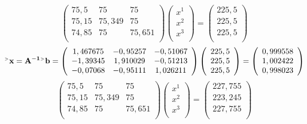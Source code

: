 \documentclass[12pt]{article}
\begin{document}
\begin{equation*}
	\left(
	\begin{array}{ccc}
		75,5 & 75 & 75\\
		75,15 & 75,349 & 75 \\
		74,85 & 75 & 75,651 \\
	\end{array}
	\right)
	\left(
	\begin{array}{c}
		x^1\\
		x^2 \\
		x^3 \\
	\end{array}
	\right)
	=
	\left(
	\begin{array}{c}
		225,5\\
		225,5\\
		225,5\\
	\end{array}
	\right)
\end{equation*}
\begin{equation*}
	\mathbf{^{\mathsmaller{>}} x=A^{-1} {}^\mathsmaller{>}b} = 
	\left(
	\begin{array}{ccc}
		1,467675 & -0,95257 & -0,51067 \\
		-1,39345 & 1,910029 & -0,51213 \\
		-0,07068 & -0,95111	& 1,026211 \\
	\end{array}
	\right)
	\left(
	\begin{array}{c}
		225,5\\
		225,5\\
		225,5\\
	\end{array}
	\right)
	=
	\left(
	\begin{array}{c}
		0,999558\\
		1,002422\\
		0,998023\\
	\end{array}
	\right)
\end{equation*}
\begin{equation*}
\left(
\begin{array}{ccc}
	75,5 & 75 & 75\\
	75,15 & 75,349 & 75 \\
	74,85 & 75 & 75,651 \\
\end{array}
\right)
	\left(
	\begin{array}{c}
		x^1\\
		x^2 \\
		x^3 \\
	\end{array}
	\right)
	=
	\left(
	\begin{array}{c}
		227,755\\
		223,245\\
		227,755\\
	\end{array}
	\right)
\end{equation*}
\end{document}
